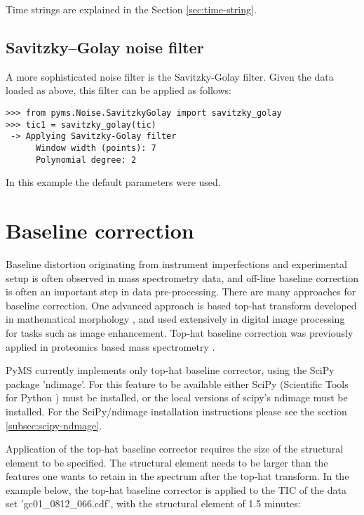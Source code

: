 Time strings are explained in the Section \ref{sec:time-string}.

\subsection{Savitzky--Golay noise filter}


A more sophisticated noise filter is the Savitzky-Golay filter.
Given the data loaded as above, this filter can be applied as
follows:

\begin{verbatim}
>>> from pyms.Noise.SavitzkyGolay import savitzky_golay
>>> tic1 = savitzky_golay(tic)
 -> Applying Savitzky-Golay filter
      Window width (points): 7
      Polynomial degree: 2
\end{verbatim}

In this example the default parameters were used.

\section{Baseline correction}


Baseline distortion originating from instrument imperfections and
experimental setup is often observed in mass spectrometry data,
and off-line baseline correction is often an important step in
data pre-processing. There are many approaches for baseline
correction. One advanced approach is based top-hat transform
developed in mathematical morphology \cite{serra83}, and used
extensively in digital image processing for tasks such as image
enhancement. Top-hat baseline correction was previously applied
in proteomics based mass spectrometry \cite{sauve04}.

PyMS currently implements only top-hat baseline corrector, using
the SciPy package 'ndimage'. For this feature to be available either
SciPy (Scientific Tools for Python \cite{scipy}) must be installed,
or the local versions of scipy's ndimage must be installed. For
the SciPy/ndimage installation instructions please see the section
\ref{subsec:scipy-ndmage}.

Application of the top-hat baseline corrector requires the size
of the structural element to be specified. The structural element
needs to be larger than the features one wants to retain in the
spectrum after the top-hat transform. In the example below, the
top-hat baseline corrector is applied to the TIC of the data set
'gc01\_0812\_066.cdf', with the structural element of 1.5 minutes:

